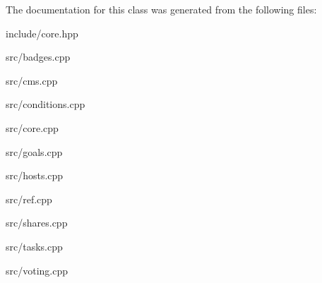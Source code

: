 The documentation for this class was generated from the following files\+:\begin{DoxyCompactItemize}
\item 
include/core.\+hpp\item 
src/badges.\+cpp\item 
src/cms.\+cpp\item 
src/conditions.\+cpp\item 
src/core.\+cpp\item 
src/goals.\+cpp\item 
src/hosts.\+cpp\item 
src/ref.\+cpp\item 
src/shares.\+cpp\item 
src/tasks.\+cpp\item 
src/voting.\+cpp\end{DoxyCompactItemize}
